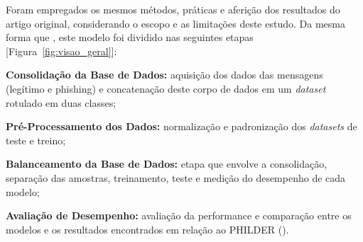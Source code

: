 \documentclass[12pt]{article}
\begin{document}
        Foram empregados os mesmos métodos,  práticas e aferição dos resultados do artigo original, considerando o escopo e as limitações deste estudo.   Da mesma forma que  \cite{bispo2025philder}, este modelo foi dividido nas seguintes etapas [Figura~\ref{fig:visao_geral}]:

\textbf{Consolidação da Base de Dados:} aquisição dos dados das mensagens (legítimo e {phishing}) e concatenação deste corpo de dados em um \textit{\textit{dataset}} rotulado em duas classes;

\textbf{Pré-Processamento dos Dados:} normalização e padronização dos \textit{\textit{dataset}s}  de teste e treino;

\textbf{Balanceamento da Base de Dados:}  etapa que envolve a consolidação, separação das amostras, treinamento, teste e medição do desempenho de cada modelo;

\textbf{Avaliação de Desempenho:} avaliação da performance e comparação entre os modelos e os resultados encontrados em relação ao PHILDER (\cite{bispo2025philder}).


\end{document}
